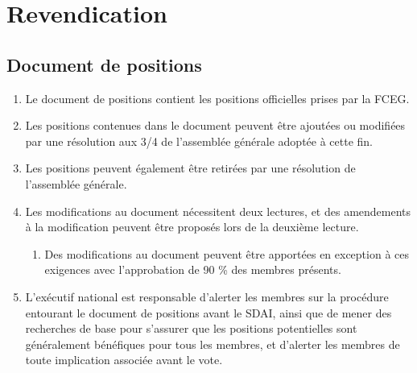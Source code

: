 \section{Revendication}
\label{revendication}

\subsection{Document de positions}
\label{revendication-document-de-positions}

\begin{enumerate}
 \item Le document de positions contient les positions officielles prises par la FCEG.
 \item Les positions contenues dans le document peuvent être ajoutées ou modifiées par une résolution aux 3/4 de l'assemblée générale adoptée à cette fin.
 \item Les positions peuvent également être retirées par une résolution de l'assemblée générale.
 \item Les modifications au document nécessitent deux lectures, et des amendements à la modification peuvent être proposés lors de la deuxième lecture.
  \begin{enumerate}
   \item Des modifications au document peuvent être apportées en exception à ces exigences avec l'approbation de 90 \% des membres présents.
  \end{enumerate}
 \item L'exécutif national est responsable d'alerter les membres sur la procédure entourant le document de positions avant le SDAI, ainsi que de mener des recherches de base pour s'assurer que les positions potentielles sont généralement bénéfiques pour tous les membres, et d'alerter les membres de toute implication associée avant le vote.
\end{enumerate}
